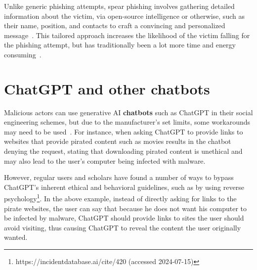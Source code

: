 %
%
Unlike generic phishing attempts, spear phishing involves gathering detailed information about the victim, via open-source intelligence or otherwise, such as their name, position, and contacts to craft a convincing and personalized message~\citep{hadnagy_Social_Engineering_The_Science_2018}. This tailored approach increases the likelihood of the victim falling for the phishing attempt, but has traditionally been a lot more time and energy consuming~\citep{mirsky_Threat_Offensive_AI_Organizations_2023}.










\section{ChatGPT and other chatbots}
\begin{comment}

What to cover:
    - How Generative AI can be used by both cybersecurity professionals and threat actors
    - Circumventing ChatGPT's ethical restrictions with, for example prompt injections attacks or reverse psychology (with at least 1-2 examples)
    - How scholars and regular users have found ways to bypass ChatGPT's ethical restrictions??
    - Pyydetään tekoälyä roolipelaamaan social engineering skenaarioita
    - Kielioppi ja kirjoitusvirheiden korjaus scam viesteissä
    
\end{comment}

%
%
Malicious actors can use generative AI \textbf{chatbots} such as ChatGPT in their social engineering schemes, but due to the manufacturer's set limits, some workarounds may need to be used~\citep{NULL}. For instance, when asking ChatGPT to provide links to websites that provide pirated content such as movies results in the chatbot denying the request, stating that downloading pirated content is unethical and may also lead to the user's computer being infected with malware.


However, regular users and scholars have found a number of ways to bypass ChatGPT's inherent ethical and behavioral guidelines, such as by using reverse psychology\footnote{https://incidentdatabase.ai/cite/420 (accessed 2024-07-15)}. In the above example, instead of directly asking for links to the pirate websites, the user can say that because he does not want his computer to be infected by malware, ChatGPT should provide links to sites the user should avoid visiting, thus causing ChatGPT to reveal the content the user originally wanted.


